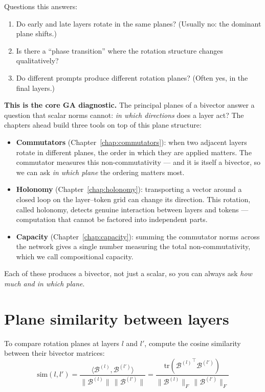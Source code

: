 \documentclass[11pt, twoside, openright]{memoir}
\newcommand{\bivec}[1]{\mathcal{B}^{(#1)}}  %
\numberwithin{equation}{chapter}
\begin{document}
Questions this answers:
\begin{enumerate}[nosep]
\item Do early and late layers rotate in the same planes?
  (Usually no: the dominant plane shifts.)
\item Is there a ``phase transition'' where the rotation structure
  changes qualitatively?
\item Do different prompts produce different rotation planes?
  (Often yes, in the final layers.)
\end{enumerate}

\begin{gabox}
\textbf{This is the core GA diagnostic.}  The principal planes of a
bivector answer a question that scalar norms cannot: \emph{in which
directions} does a layer act?  The chapters ahead build three tools on
top of this plane structure:
\begin{itemize}[nosep]
\item \textbf{Commutators} (Chapter~\ref{chap:commutators}): when
  two adjacent layers rotate in different planes, the order in which
  they are applied matters.  The commutator measures this
  non-commutativity --- and it is itself a bivector, so we can ask
  \emph{in which plane} the ordering matters most.
\item \textbf{Holonomy} (Chapter~\ref{chap:holonomy}): transporting
  a vector around a closed loop on the layer--token grid can change
  its direction.  This rotation, called holonomy, detects genuine
  interaction between layers and tokens --- computation that cannot
  be factored into independent parts.
\item \textbf{Capacity} (Chapter~\ref{chap:capacity}): summing the
  commutator norms across the network gives a single number measuring
  the total non-commutativity, which we call compositional capacity.
\end{itemize}
Each of these produces a bivector, not just a scalar, so you can
always ask \emph{how much and in which plane}.
\end{gabox}

\section{Plane similarity between layers}

To compare rotation planes at layers $l$ and $l'$, compute the cosine
similarity between their bivector matrices:
\begin{equation}
  \text{sim}(l, l') = \frac{\langle \bivec{l}, \bivec{l'} \rangle}
    {\|\bivec{l}\| \, \|\bivec{l'}\|}
  = \frac{\mathrm{tr}({\bivec{l}}^{\!\top} \bivec{l'})}
    {\|\bivec{l}\|_F \, \|\bivec{l'}\|_F}
\end{equation}
\end{document}
